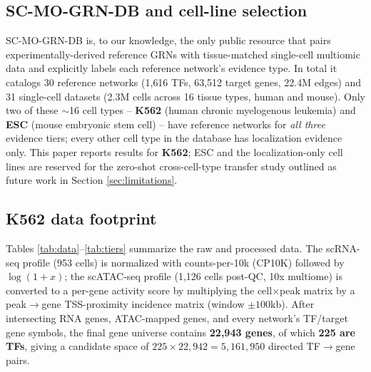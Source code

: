 \documentclass{article}
\theoremstyle{plain}
\theoremstyle{definition}
\begin{document}
\subsection{SC-MO-GRN-DB and cell-line selection}
SC-MO-GRN-DB \cite{valensi2026scmogrndb} is, to our knowledge, the only public
resource that pairs experimentally-derived reference GRNs with tissue-matched
single-cell multiomic data and explicitly labels each reference network's
evidence type. In total it catalogs 30 reference networks (1{,}616 TFs, 63{,}512
target genes, 22.4M edges) and 31 single-cell datasets (2.3M cells across 16
tissue types, human and mouse). Only two of these $\sim$16 cell types --
\textbf{K562} (human chronic myelogenous leukemia) and \textbf{ESC} (mouse
embryonic stem cell) -- have reference networks for \emph{all three} evidence
tiers; every other cell type in the database has localization evidence only.
This paper reports results for \textbf{K562}; ESC and the localization-only
cell lines are reserved for the zero-shot cross-cell-type transfer study
outlined as future work in Section \ref{sec:limitations}.

\subsection{K562 data footprint}
Tables \ref{tab:data}--\ref{tab:tiers} summarize the raw and processed data. The scRNA-seq
profile (953 cells) is normalized with counts-per-10k (CP10K) followed by
$\log(1+x)$; the scATAC-seq profile (1{,}126 cells post-QC, 10x multiome) is
converted to a per-gene activity score by multiplying the cell$\times$peak
matrix by a peak$\rightarrow$gene TSS-proximity incidence matrix (window
$\pm100$kb). After intersecting RNA genes, ATAC-mapped genes, and every
network's TF/target gene symbols, the final gene universe contains
\textbf{22{,}943 genes}, of which \textbf{225 are TFs}, giving a candidate space
of $225 \times 22{,}942 = 5{,}161{,}950$ directed TF$\to$gene pairs.
\end{document}
